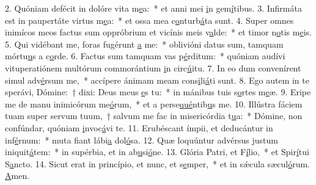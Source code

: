 2. Quóniam defécit in dolóre vita m\uline{e}a:~* et anni mei \uline{i}n gem\uline{í}tibus.
3. Infirmáta est in paupertáte virtus m\uline{e}a:~* et ossa mea c\uline{o}nturb\uline{á}ta sunt.
4. Super omnes inimícos meos factus sum oppróbrium et vicínis meis v\uline{a}lde:~* et timor n\uline{o}tis m\uline{e}is.
5. Qui vidébant me, foras fugérunt \uline{a} me:~* oblivióni datus sum, tamquam mórtu\uline{u}s a c\uline{o}rde.
6. Factus sum tamquam vas p\uline{é}rditum:~* quóniam audívi vituperatiónem multórum commorántium \uline{i}n circ\uline{ú}itu.
7. In eo dum convenírent simul adv\uline{é}rsum me,~* accípere ánimam meam cons\uline{i}li\uline{á}ti sunt.
8. Ego autem in te sperávi, Dómine:~† dixi: Deus meus \uline{e}s tu:~* in mánibus tuis s\uline{o}rtes m\uline{e}æ.
9. Eripe me de manu inimicórum me\uline{ó}rum,~* et a perse\uline{qué}ntib\uline{u}s me.
10. Illústra fáciem tuam super servum tuum,~† salvum me fac in misericórdia t\uline{u}a:~* Dómine, non confúndar, quóniam \uline{i}nvoc\uline{á}vi te.
11. Erubéscant ímpii, et deducántur in inf\uline{é}rnum:~* muta fiant lábi\uline{a} dol\uline{ó}sa.
12. Quæ loquúntur advérsus justum iniquit\uline{á}tem:~* in supérbia, et in ab\uline{u}si\uline{ó}ne.
13. Glória Patri, et F\uline{í}lio,~* et Spir\uline{í}tui S\uline{a}ncto.
14. Sicut erat in princípio, et nunc, et s\uline{e}mper,~* et in sǽcula sæcul\uline{ó}rum. \uline{A}men.

